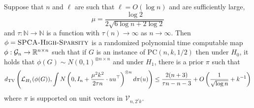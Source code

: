 \begin{lemma} \label{lem:hsspca}
Suppose that $n$ and $\ell$ are such that $\ell = O(\log n)$ and are sufficiently large,
$$\mu = \frac{\log 2}{2 \sqrt{6 \log n + 2\log 2}}$$
and $\tau : \mathbb{N} \to \mathbb{N}$ is a function with $\tau(n) \to \infty$ as $n \to \infty$. Then $\phi = \textsc{SPCA-High-Sparsity}$ is a randomized polynomial time computable map $\phi : \mathcal{G}_n \to \mathbb{R}^{n \times n}$ such that if $G$ is an instance of $\text{PC}(n, k, 1/2)$ then under $H_0$, it holds that $\phi(G) \sim N(0, 1)^{\otimes n \times n}$ and under $H_1$, there is a prior $\pi$ such that
$$d_{\text{TV}}\left( \mathcal{L}_{H_1}(\phi(G)), \int N\left(0, I_n + \frac{\mu^2 k^2}{2 \tau n} \cdot uu^\top\right)^{\otimes n} d\pi(u) \right) \le \frac{2(n + 3)}{\tau n - n - 3} + O\left( \frac{1}{\sqrt{\log n}} + k^{-1} \right)$$
where $\pi$ is supported on unit vectors in $\mathcal{V}_{n, 2^\ell k}$.
\end{lemma}

